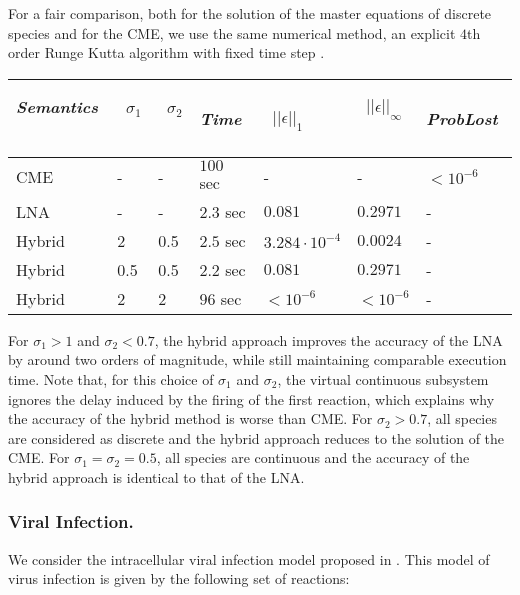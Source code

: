 \documentclass{llncs}
\begin{document}
For a fair comparison,  
both for the solution of the master equations of discrete species and for the CME, 
we use the same numerical method,  an explicit $4$th order Runge Kutta algorithm with fixed time step \cite{henzinger2010hybrid}. 
{\footnotesize\begin{center}
\renewcommand{\baselinestretch}{.8}
	\begin{tabular}{|l|l|l|l|l|l|l|}
	\hline
	\emph{Semantics}          \,  &  \,	$\sigma_1$  \,  &   \, $\sigma_2$   \, &   \,	\emph{Time}	 \,  & \,  $||\epsilon||_{1}$ \, 	  & \,  	$||\epsilon||_{\infty}$ 	\, 	 & \,  \emph{ProbLost} \,      \\ 
	\hline
	CME        &  - & - &		  $100$ sec           	 & -& - & 	 	$<10^{-6}$     \\ 
	LNA        & 	-&  -&	  $2.3$ sec           	 & 	 	$0.081$  &  $0.2971$ & -  \\ 
	Hybrid   &  2   &  0.5  &		  $2.5$   sec      	 & 	 	$3.284\cdot 10^{-4}$     &  $0.0024$ &-  \\  
	Hybrid   &  0.5   &  0.5  &		 $2.2$    sec      	 & 	 $0.081$	     &  $0.2971$ &- \\  
	Hybrid   &  2   &  2  &		    $96$ sec      	 & 	 $<10^{-6}$	    &   $<10^{-6}$  & - \\  
	\hline
	\end{tabular}
\end{center}}
For $\sigma_1>1$ and $\sigma_2<0.7$, the hybrid approach improves the accuracy of the LNA by around two orders of magnitude, while still maintaining comparable execution time. Note that, for this choice of $\sigma_1$ and $\sigma_2$, the virtual continuous subsystem ignores the delay induced by the firing of the first reaction, which explains %
why the accuracy of the hybrid method is worse than CME.
For $\sigma_2>0.7$, all species are considered as discrete and the hybrid approach reduces to the solution of the CME. For $\sigma_1=\sigma_2=0.5$, all species are continuous and the accuracy of the hybrid approach is identical to that of the LNA. 

\subsubsection{Viral Infection.}
We consider the intracellular viral infection model proposed in \cite{srivastava2002stochastic}.
This model of virus infection is given by the following set of reactions:
\end{document}
